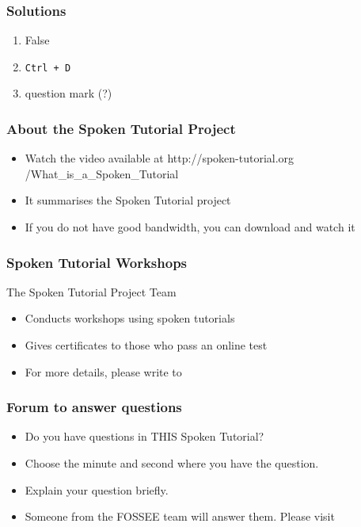 \documentclass[17pt]{beamer}
\begin{document}
\begin{frame}
\frametitle{Solutions}
\begin{enumerate}
\item False
\item \texttt{Ctrl + D}
\item question mark (?)
\end{enumerate}
\end{frame}
\begin{frame}
\frametitle{About the Spoken Tutorial Project}
\begin{itemize}
\item Watch the video available at {\color{blue}http://spoken-tutorial.org /What\_is\_a\_Spoken\_Tutorial}
\item It summarises the Spoken Tutorial project \pause
\item If you do not have good bandwidth, you can download and watch it
\end{itemize}
\end{frame}
\begin{frame}
\frametitle{Spoken Tutorial Workshops}The Spoken Tutorial Project Team 
\begin{itemize}
\item Conducts workshops using spoken tutorials 
\item Gives certificates to those who pass an online test 
\item For more details, please write to \\ 
\end{itemize}
\end{frame}
\begin{frame}
\frametitle{Forum to answer questions}
\begin{itemize}
\item Do you have questions in THIS Spoken Tutorial?
\item Choose the minute and second where you have the question.
\item Explain your question briefly.
\item Someone from the FOSSEE team will answer them. Please visit 
\end{itemize}
\begin{center}
{\color{blue}{http://forums.spoken-tutorial.org/}}
 \end{center} 
\end{frame}
\end{document}
